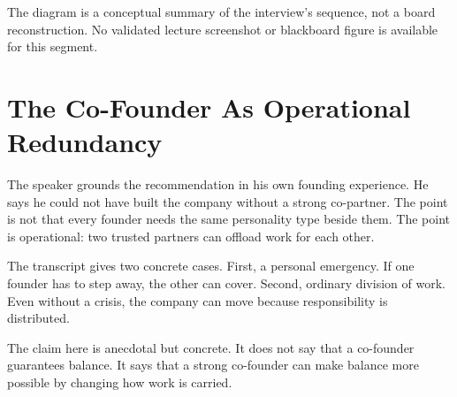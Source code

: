 \begin{figure}
\centering
{}
\end{figure}

The diagram is a conceptual summary of the interview's sequence, not a board reconstruction. No validated lecture screenshot or blackboard figure is available for this segment.

\section{The Co-Founder As Operational Redundancy}

The speaker grounds the recommendation in his own founding experience. He says he could not have built the company without a strong co-partner. The point is not that every founder needs the same personality type beside them. The point is operational: two trusted partners can offload work for each other.

The transcript gives two concrete cases. First, a personal emergency. If one founder has to step away, the other can cover. Second, ordinary division of work. Even without a crisis, the company can move because responsibility is distributed.

\begin{remark}
The claim here is anecdotal but concrete. It does not say that a co-founder guarantees balance. It says that a strong co-founder can make balance more possible by changing how work is carried.
\end{remark}

